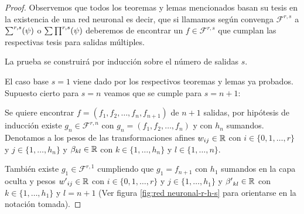 \begin{proof}
    Observemos que todos los teoremas y lemas mencionados basan su tesis
    en la existencia de una red neuronal es decir, que si llamamos según 
    convenga $\mathcal{F}^{r,s}$ a $\sum^{r,s} (\psi)$ o $\sum \prod^{r,s} (\psi)$ deberemos de 
    encontrar un $f \in \mathcal{F}^{r,s}$ que cumplan las respectivas tesis para salidas múltiples. 

    La prueba se construirá por inducción sobre el número de salidas $s$. 

\reversemarginpar
\setlength{\marginparwidth}{\smallMarginSize}

\normalmarginpar
\setlength{\marginparwidth}{\bigMarginSize}

    El caso base $s=1$ viene dado por los respectivos teoremas y lemas ya probados.
    Supuesto cierto para $s = n$ veamos que se cumple para $s=n+1$: 
    
    Se quiere encontrar 
    $f = (f_1, f_2, \ldots, f_n, f_{n+1})$ de $n+1$ salidas, 
    por hipótesis de inducción existe $g_n \in \mathcal{F}^{r,n}$ con
     $g_n = (f_1, f_2, \ldots, f_n)$ y con $h_n$ sumandos. Denotamos a los pesos de las transformaciones afines 
     $w_{i j} \in \mathbb{R}$ con 
     $i \in \{0, 1, \ldots , r \}$  y  $j \in \{1, \ldots ,h_n \}$ 
     y $\beta_{ k l} \in \mathbb{R}$ con 
     $k \in \{1, \ldots ,h_n \}$  y  $l \in \{1, \ldots ,n \}.$

    También existe $g_1 \in \mathcal{F}^{r,1}$ cumpliendo que
    $g_1 = f_{n+1}$ con $h_1$ sumandos en la capa oculta
    y pesos  
    ${w'}_{i j} \in \mathbb{R}$ con 
     $i \in \{0, 1, \ldots , r \}$  y  $j \in \{1, \ldots , h_1 \}$ 
     y ${\beta '}_{ k l} \in \mathbb{R}$ con 
     $k \in \{1, \ldots , h_1 \}$  y  $l = {n+1}$
     (Ver figura \ref{fig:red neuronal-r-h-s} para orientarse en la notación tomada).
     

\end{proof}
